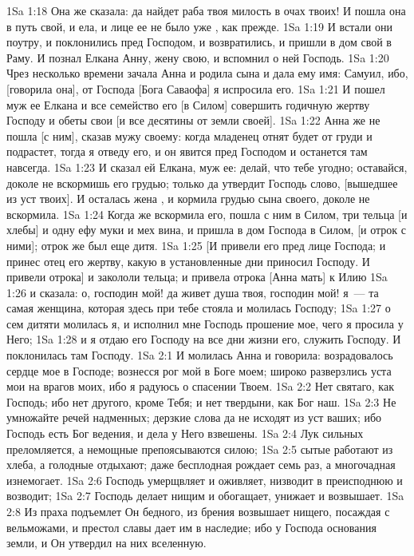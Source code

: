 \vs 1Sa 1:18 Она же сказала: да найдет раба твоя милость в очах твоих! И пошла она в путь свой, и ела, и лице ее не было уже , как прежде.
\vs 1Sa 1:19 И встали они поутру, и поклонились пред Господом, и возвратились, и пришли в дом свой в Раму. И познал Елкана Анну, жену свою, и вспомнил о ней Господь.
\vs 1Sa 1:20 Чрез несколько времени зачала Анна и родила сына и дала ему имя: Самуил, ибо, [говорила она], от Господа [Бога Саваофа] я испросила его.
\vs 1Sa 1:21 И пошел муж ее Елкана и все семейство его [в Силом] совершить годичную жертву Господу и обеты свои [и все десятины от земли своей].
\vs 1Sa 1:22 Анна же не пошла [с ним], сказав мужу своему: когда младенец отнят будет от груди и подрастет, тогда я отведу его, и он явится пред Господом и останется там навсегда.
\vs 1Sa 1:23 И сказал ей Елкана, муж ее: делай, что тебе угодно; оставайся, доколе не вскормишь его грудью; только да утвердит Господь слово, [вышедшее из уст твоих]. И осталась жена , и кормила грудью сына своего, доколе не вскормила.
\rsbpar\vs 1Sa 1:24 Когда же вскормила его, пошла с ним в Силом,  три тельца [и хлебы] и одну ефу муки и мех вина, и пришла в дом Господа в Силом, [и отрок с ними]; отрок же был еще дитя.
\vs 1Sa 1:25 [И привели его пред лице Господа; и принес отец его жертву, какую в установленные дни приносил Господу. И привели отрока] и закололи тельца; и привела отрока [Анна мать] к Илию
\vs 1Sa 1:26 и сказала: о, господин мой! да живет душа твоя, господин мой! я~--- та самая женщина, которая здесь при тебе стояла и молилась Господу;
\vs 1Sa 1:27 о сем дитяти молилась я, и исполнил мне Господь прошение мое, чего я просила у Него;
\vs 1Sa 1:28 и я отдаю его Господу на все дни жизни его, служить Господу. И поклонилась там Господу.
\vs 1Sa 2:1 И молилась Анна и говорила: возрадовалось сердце мое в Господе; вознесся рог мой в Боге моем; широко разверзлись уста мои на врагов моих, ибо я радуюсь о спасении Твоем.
\vs 1Sa 2:2 Нет  святаго, как Господь; ибо нет другого, кроме Тебя; и нет твердыни, как Бог наш.
\vs 1Sa 2:3 Не умножайте речей надменных; дерзкие слова да не исходят из уст ваших; ибо Господь есть Бог ведения, и дела у Него взвешены.
\vs 1Sa 2:4 Лук сильных преломляется, а немощные препоясываются силою;
\vs 1Sa 2:5 сытые работают из хлеба, а голодные отдыхают; даже бесплодная рождает семь раз, а многочадная изнемогает.
\vs 1Sa 2:6 Господь умерщвляет и оживляет, низводит в преисподнюю и возводит;
\vs 1Sa 2:7 Господь делает нищим и обогащает, унижает и возвышает.
\vs 1Sa 2:8 Из праха подъемлет Он бедного, из брения возвышает нищего, посаждая с вельможами, и престол славы дает им в наследие; ибо у Господа основания земли, и Он утвердил на них вселенную.
